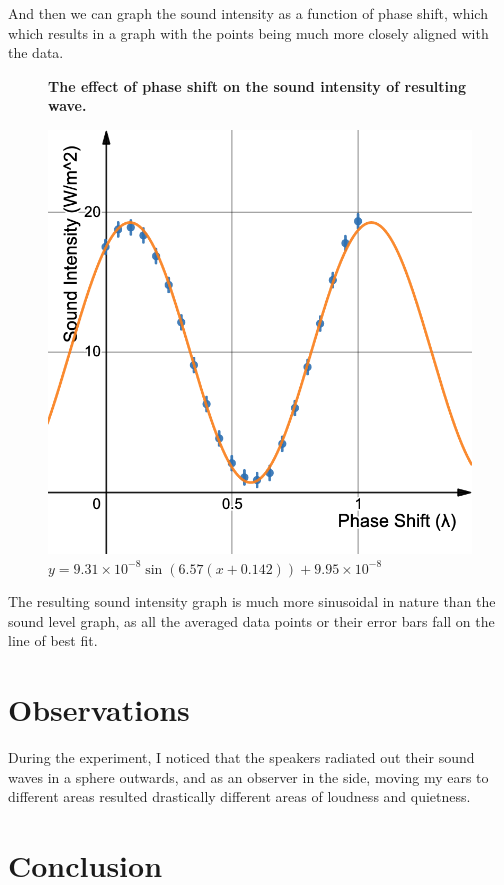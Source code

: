\documentclass[index]{subfiles}
\begin{document}
And then we can graph the sound intensity as a function of phase shift, which which results in a graph with the points being much more closely aligned with the data.

\begin{figure}[H]
    \centering
    \textbf{The effect of phase shift on the sound intensity of resulting wave.}\medskip\par
    \includegraphics[scale=0.3]{graph-calc.png}
    \caption{\(y=9.31\times 10^{-8}\sin\left(6.57\left(x+0.142\right)\right)+9.95\times 10^{-8}\) }
\end{figure}

The resulting sound intensity graph is much more sinusoidal in nature than the sound level graph, as all the averaged data points or their error bars fall on the line of best fit.

\section{Observations}

During the experiment, I noticed that the speakers radiated out their sound waves in a sphere outwards, and as an observer in the side, moving my ears to different areas resulted drastically different areas of loudness and quietness.

\section{Conclusion}
\end{document}
